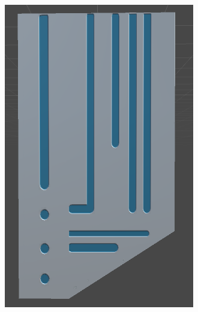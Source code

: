 \documentclass[xcolor=dvipsnames]{beamer}
\begin{document}
\begin{frame}
\begin{columns}[T]
\begin{column}{0.3\textwidth}
\begin{figure}[ht]
				\end{figure}
				\begin{figure}[ht]
					\includegraphics[scale=0.2]{images/alpha/keycardModel}
				\end{figure}
			\end{column}
		\end{columns}
	\end{frame}
	
\end{document}
